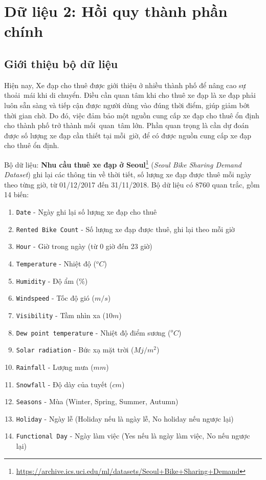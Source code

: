 \section{Dữ liệu 2: Hồi quy thành phần chính}

\subsection*{Giới thiệu bộ dữ liệu}
Hiện nay, Xe đạp cho thuê được giới thiệu ở nhiều thành phố để nâng cao sự thoải~mái khi di chuyển. Điều cần quan tâm khi cho thuê xe đạp là xe đạp phải luôn sẵn sàng và tiếp cận được người dùng vào đúng thời điểm, giúp giảm bớt thời gian chờ. Do đó, việc đảm bảo một nguồn cung cấp xe đạp cho thuê ổn định cho thành phố trở thành mối~quan~tâm lớn. Phần quan trọng là cần dự đoán được số lượng xe đạp cần thiết tại mỗi~giờ, để có được nguồn cung cấp xe đạp cho thuê ổn định.

Bộ dữ liệu: \textbf{Nhu cầu thuê xe đạp ở Seoul}\footnote{\url{https://archive.ics.uci.edu/ml/datasets/Seoul+Bike+Sharing+Demand}} ({\textit{Seoul Bike Sharing Demand Dataset}}) ghi lại các thông tin về thời tiết, số lượng xe đạp được thuê mỗi ngày theo từng giờ, từ 01/12/2017 đến 31/11/2018. Bộ dữ liệu có 8760 quan trắc, gồm 14 biến:
\begin{enumerate}
	\item \texttt{Date} - Ngày ghi lại số lượng xe đạp cho thuê
	\item \texttt{Rented Bike Count} - Số lượng xe đạp được thuê, ghi lại theo mỗi giờ
	\item \texttt{Hour} - Giờ trong ngày (từ 0 giờ đến 23 giờ)
	\item \texttt{Temperature} - Nhiệt độ ($^o C$)
	\item \texttt{Humidity} - Độ ẩm (\%)
	\item \texttt{Windspeed} - Tốc độ gió ($m/s$)
	\item \texttt{Visibility} - Tầm nhìn xa ($10m$)
	\item \texttt{Dew point temperature} - Nhiệt độ điểm sương ($^o C$)
	\item \texttt{Solar radiation} - Bức xạ mặt trời ($Mj/m^2$)
	\item \texttt{Rainfall} - Lượng mưa ($mm$)
	\item \texttt{Snowfall} - Độ dày của tuyết ($cm$)
	\item \texttt{Seasons} - Mùa (Winter, Spring, Summer, Autumn)
	\item \texttt{Holiday} - Ngày lễ (Holiday nếu là ngày lễ, No holiday nếu ngược lại)
	\item \texttt{Functional Day} - Ngày làm việc (Yes nếu là ngày làm việc, No nếu ngược lại)
\end{enumerate}

